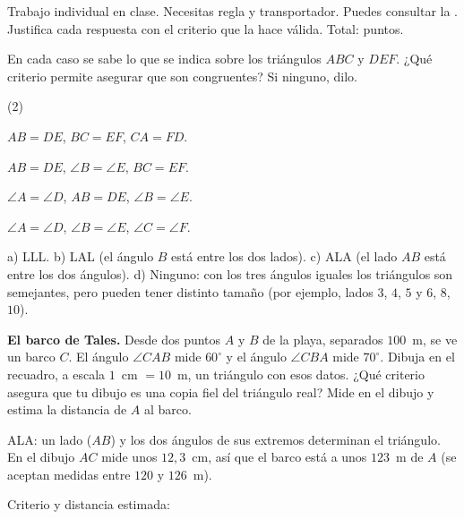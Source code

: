 \documentclass[11pt]{article}
\begin{document}
\encabezado

\begin{instrucciones}
Trabajo individual en clase. Necesitas regla y transportador. Puedes consultar la
. Justifica cada respuesta con el criterio que la hace válida.
Total: \totalpuntos{} puntos.
\end{instrucciones}

\begin{preguntas}

\pregunta[2] En cada caso se sabe lo que se indica sobre los triángulos $ABC$ y $DEF$.
¿Qué criterio permite asegurar que son congruentes? Si ninguno, dilo.
\begin{opciones*}(2)
  \item $AB = DE$, $BC = EF$, $CA = FD$.
  \item $AB = DE$, $\angle B = \angle E$, $BC = EF$.
  \item $\angle A = \angle D$, $AB = DE$, $\angle B = \angle E$.
  \item $\angle A = \angle D$, $\angle B = \angle E$, $\angle C = \angle F$.
\end{opciones*}
\begin{solucion}[3.5cm]
a) LLL. b) LAL (el ángulo $B$ está entre los dos lados). c) ALA (el lado $AB$ está entre
los dos ángulos). d) Ninguno: con los tres ángulos iguales los triángulos son semejantes,
pero pueden tener distinto tamaño (por ejemplo, lados $3$, $4$, $5$ y $6$, $8$, $10$).
\end{solucion}

\pregunta[1.5] \textbf{El barco de Tales.} Desde dos puntos $A$ y $B$ de la playa,
separados $100$~m, se ve un barco $C$. El ángulo $\angle CAB$ mide $60^\circ$ y el ángulo
$\angle CBA$ mide $70^\circ$. Dibuja en el recuadro, a escala $1$~cm $= 10$~m, un
triángulo con esos datos. ¿Qué criterio asegura que tu dibujo es una copia fiel del
triángulo real? Mide en el dibujo y estima la distancia de $A$ al barco.
\begin{solucion}
ALA: un lado ($AB$) y los dos ángulos de sus extremos determinan el triángulo. En el dibujo
$AC$ mide unos $12{,}3$~cm, así que el barco está a unos $123$~m de $A$ (se aceptan medidas
entre $120$ y $126$~m).
\end{solucion}
\ifdefined\clave\else
\par\medskip\noindent\framebox[\linewidth]{\rule{0pt}{6cm}}\par\medskip
Criterio y distancia estimada: 
\fi


\end{preguntas}
\end{document}
